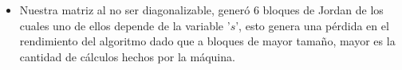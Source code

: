 \documentclass[utf8,spanish,xcolor={svgnames},12pt,handout]{beamer}
\begin{document}
\begin{frame}
	\begin{itemize}
		\item Nuestra matriz al no ser diagonalizable, gener\'o 6 bloques de Jordan de los cuales uno de ellos depende de la variable '$s$', esto genera una p\'erdida en el rendimiento del algoritmo dado que a bloques de mayor tamaño, mayor es la cantidad de cálculos hechos por la m\'aquina.
	\end{itemize}
\end{frame}
\end{document}
